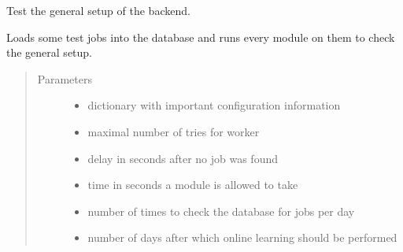 \documentclass[letterpaper,10pt,english]{sphinxmanual}
\begin{document}

\begin{fulllineitems}
\label{\detokenize{api:backend.test_simple}}
Test the general setup of the backend.

Loads some test jobs into the database and runs every module on
them to check the general setup.
\begin{quote}\begin{description}
\item[{Parameters}] \leavevmode\begin{itemize}
\item {} 
 \textendash{} dictionary with important configuration information

\item {} 
 \textendash{} maximal number of tries for worker

\item {} 
 \textendash{} delay in seconds after no job was found

\item {} 
 \textendash{} time in seconds a module is allowed to take

\item {} 
 \textendash{} number of times to check the database for jobs per day

\item {} 
 \textendash{} number of days after which online learning should
be performed

\end{itemize}

\end{description}\end{quote}

\end{fulllineitems}

\end{document}
